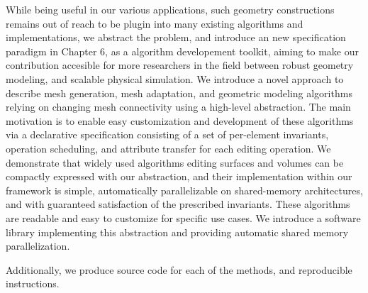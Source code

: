 While being useful in our various applications, such geometry constructions remains out of reach to be plugin into many existing algorithms and implementations, we abstract the problem, and introduce an new specification paradigm in Chapter 6, as a algorithm developement toolkit, aiming to make our contribution accesible for more researchers in the field between robust geometry modeling, and scalable physical simulation.
We introduce a novel approach to describe mesh generation, mesh adaptation, and geometric modeling algorithms relying on changing mesh connectivity using a high-level abstraction. The main motivation is to enable easy customization and development of these algorithms via a declarative specification consisting of a set of per-element invariants, operation scheduling, and attribute transfer for each editing operation.
We demonstrate that widely used algorithms editing surfaces and volumes can be compactly expressed with our abstraction, and their implementation within our framework is simple, automatically parallelizable on shared-memory architectures, and with guaranteed satisfaction of the prescribed invariants. These algorithms are readable and easy to customize for specific use cases.
We introduce a software library implementing this abstraction and providing automatic shared memory parallelization.

Additionally, we produce source code for each of the methods, and reproducible instructions.


